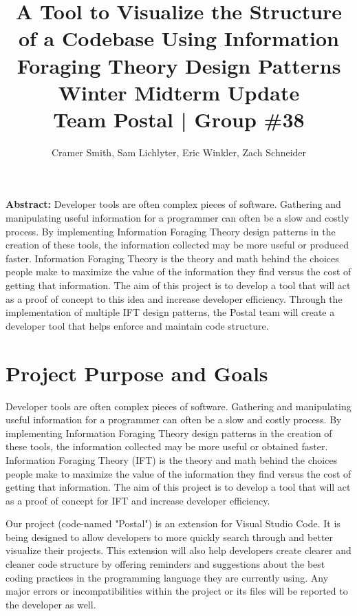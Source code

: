 \documentclass[letterpaper,10pt,titlepage,draftclsnofoot,onecolumn,onesided] {IEEEtran}
\def\doctitle{A Tool to Visualize the Structure of a Codebase Using Information Foraging Theory Design Patterns}
\def\doctype{Progress Report}
\def\doctype{Winter Midterm Update}
\def\team{Team Postal | Group \#38}
\begin{document}
\title{\Huge{\bfseries{\textsf{\doctitle}}}\\\textsf{\Large{\doctype}}\\\textsf{\large{\team}}}
\author{Cramer Smith, Sam Lichlyter, Eric Winkler, Zach Schneider}

\maketitle
\vfill

\setlength\parindent{0pt} \textbf{Abstract:} Developer tools are often complex pieces of software. 
Gathering and manipulating useful information for a programmer can often be a slow and costly process. 
By implementing Information Foraging Theory design patterns in the creation of these tools, the information collected may be more useful or produced faster. 
Information Foraging Theory is the theory and math behind the choices people make to maximize the value of the information they find versus the cost of getting that information.
The aim of this project is to develop a tool that will act as a proof of concept to this idea and increase developer efficiency.
Through the implementation of multiple IFT design patterns, the Postal team will create a developer tool that helps enforce and maintain code structure. 

\vfill

\pagebreak

\tableofcontents


\pagebreak

\section{Project Purpose and Goals}
Developer tools are often complex pieces of software. 
Gathering and manipulating useful information for a programmer can often be a slow and costly process. 
By implementing Information Foraging Theory design patterns in the creation of these tools, the information collected may be more useful or obtained faster. 
Information Foraging Theory (IFT) is the theory and math behind the choices people make to maximize the value of the information they find versus the cost of getting that information.
The aim of this project is to develop a tool that will act as a proof of concept for IFT and increase developer efficiency.

Our project (code-named "Postal") is an extension for Visual Studio Code. 
It is being designed to allow developers to more quickly search through and better visualize their projects.
This extension will also help developers create clearer and cleaner code structure by offering reminders and suggestions about the best coding practices in the programming language they are currently using.
Any major errors or incompatibilities within the project or its files will be reported to the developer as well.
\end{document}

